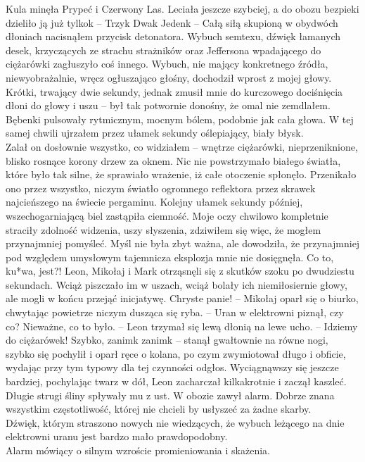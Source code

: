 \documentclass[../MAIN.tex]{subfiles}
\begin{document}
Kula minęła Prypeć i Czerwony Las. Leciała jeszcze szybciej, a do obozu bezpieki dzieliło ją już tylko\3k
\swk -- Trzy\3k Dwa\3k Jeden\3k -- \qwk
Całą siłą skupioną w obydwóch dłoniach nacisnąłem przycisk detonatora. Wybuch semtexu, dźwięk łamanych desek, krzyczących ze strachu strażników oraz Jeffersona wpadającego do ciężarówki zagłuszyło coś innego. Wybuch, nie mający konkretnego źródła, niewyobrażalnie, wręcz ogłuszająco głośny, dochodził wprost z mojej głowy. Krótki, trwający dwie sekundy, jednak zmusił mnie do kurczowego dociśnięcia dłoni do głowy i uszu -- był tak potwornie donośny, że omal nie zemdlałem. Bębenki pulsowały rytmicznym, mocnym bólem, podobnie jak cała głowa. W tej samej chwili ujrzałem przez ułamek sekundy oślepiający, biały błysk. \\
Zalał on dosłownie wszystko, co widziałem -- wnętrze ciężarówki, nieprzeniknione, blisko rosnące korony drzew za oknem. Nic nie powstrzymało białego światła, które było tak silne, że sprawiało wrażenie, iż całe otoczenie spłonęło. Przenikało ono przez wszystko, niczym światło ogromnego reflektora przez skrawek najcieńszego na świecie pergaminu. Kolejny ułamek sekundy później, wszechogarniającą biel zastąpiła ciemność. Moje oczy chwilowo kompletnie straciły zdolność widzenia, uszy słyszenia, zdziwiłem się więc, że mogłem przynajmniej pomyśleć. Myśl nie była zbyt ważna, ale dowodziła, że przynajmniej pod względem umysłowym tajemnicza eksplozja mnie nie dosięgnęła.
\sx Co to, ku*wa, jest?! \qd
Leon, Mikołaj i Mark otrząsnęli się z skutków szoku po dwudziestu sekundach. Wciąż piszczało im w uszach, wciąż bolały ich niemiłosiernie głowy, ale mogli w końcu przejąć inicjatywę.
\sx Chryste panie! -- Mikołaj oparł się o biurko, chwytając powietrze niczym dusząca się ryba. -- Uran w elektrowni piznął, czy co?
\xx Nieważne, co to było. -- Leon trzymał się lewą dłonią na lewe ucho. -- Idziemy do ciężarówek! Szybko, zanim\3k zanim\3k -- stanął gwałtownie na równe nogi, szybko się pochylił i oparł ręce o kolana, po czym zwymiotował długo i obficie, wydając przy tym typowy dla tej czynności odgłos.
\qd
Wyciągnąwszy się jeszcze bardziej, pochylając twarz w dół, Leon zacharczał kilkakrotnie i zaczął kaszleć. Długie strugi śliny spływały mu z ust. W obozie zawył alarm. Dobrze znana wszystkim częstotliwość, której nie chcieli by usłyszeć za żadne skarby. \\
Dźwięk, którym straszono nowych nie wiedzących, że wybuch leżącego na dnie elektrowni uranu jest bardzo mało prawdopodobny. \\
Alarm mówiący o silnym wzroście promieniowania i skażenia. \\
\end{document}
